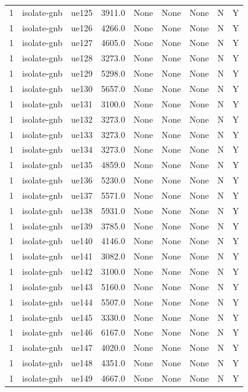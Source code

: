 \begin{table}[ht]
\begin{tabular}{|c|c|c|c|c|c|c|c|c|}
1 & isolate-gnb & ue125 & 3911.0 & None & None & None & N & Y \\
1 & isolate-gnb & ue126 & 4266.0 & None & None & None & N & Y \\
1 & isolate-gnb & ue127 & 4605.0 & None & None & None & N & Y \\
1 & isolate-gnb & ue128 & 3273.0 & None & None & None & N & Y \\
1 & isolate-gnb & ue129 & 5298.0 & None & None & None & N & Y \\
1 & isolate-gnb & ue130 & 5657.0 & None & None & None & N & Y \\
1 & isolate-gnb & ue131 & 3100.0 & None & None & None & N & Y \\
1 & isolate-gnb & ue132 & 3273.0 & None & None & None & N & Y \\
1 & isolate-gnb & ue133 & 3273.0 & None & None & None & N & Y \\
1 & isolate-gnb & ue134 & 3273.0 & None & None & None & N & Y \\
1 & isolate-gnb & ue135 & 4859.0 & None & None & None & N & Y \\
1 & isolate-gnb & ue136 & 5230.0 & None & None & None & N & Y \\
1 & isolate-gnb & ue137 & 5571.0 & None & None & None & N & Y \\
1 & isolate-gnb & ue138 & 5931.0 & None & None & None & N & Y \\
1 & isolate-gnb & ue139 & 3785.0 & None & None & None & N & Y \\
1 & isolate-gnb & ue140 & 4146.0 & None & None & None & N & Y \\
1 & isolate-gnb & ue141 & 3082.0 & None & None & None & N & Y \\
1 & isolate-gnb & ue142 & 3100.0 & None & None & None & N & Y \\
1 & isolate-gnb & ue143 & 5160.0 & None & None & None & N & Y \\
1 & isolate-gnb & ue144 & 5507.0 & None & None & None & N & Y \\
1 & isolate-gnb & ue145 & 3330.0 & None & None & None & N & Y \\
1 & isolate-gnb & ue146 & 6167.0 & None & None & None & N & Y \\
1 & isolate-gnb & ue147 & 4020.0 & None & None & None & N & Y \\
1 & isolate-gnb & ue148 & 4351.0 & None & None & None & N & Y \\
1 & isolate-gnb & ue149 & 4667.0 & None & None & None & N & Y \\

\end{tabular}
\end{table}

